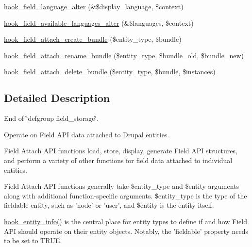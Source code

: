 \begin{DoxyCompactItemize}
\item 
\hyperlink{group__field__attach_ga6411d5b5a528850a6e53c87ff899cabc}{hook\_\-field\_\-language\_\-alter} (\&\$display\_\-language, \$context)
\item 
\hyperlink{group__field__attach_gaea2e719de3ad070e161d0d386dd18303}{hook\_\-field\_\-available\_\-languages\_\-alter} (\&\$languages, \$context)
\item 
\hyperlink{group__field__attach_gad2e99b8b55c106c289a8241db00f0f30}{hook\_\-field\_\-attach\_\-create\_\-bundle} (\$entity\_\-type, \$bundle)
\item 
\hyperlink{group__field__attach_gaf218d913150bda6004d5d8e112d3174a}{hook\_\-field\_\-attach\_\-rename\_\-bundle} (\$entity\_\-type, \$bundle\_\-old, \$bundle\_\-new)
\item 
\hyperlink{group__field__attach_gac2aac33854dd18a2037a13b133c26481}{hook\_\-field\_\-attach\_\-delete\_\-bundle} (\$entity\_\-type, \$bundle, \$instances)
\end{DoxyCompactItemize}


\subsection{Detailed Description}
End of \char`\"{}defgroup field\_\-storage\char`\"{}.

Operate on Field API data attached to Drupal entities.

Field Attach API functions load, store, display, generate Field API structures, and perform a variety of other functions for field data attached to individual entities.

Field Attach API functions generally take \$entity\_\-type and \$entity arguments along with additional function-\/specific arguments. \$entity\_\-type is the type of the fieldable entity, such as 'node' or 'user', and \$entity is the entity itself.

\hyperlink{group__hooks_gaf02318e9d0e8cdbf6d187b271b9969a8}{hook\_\-entity\_\-info()} is the central place for entity types to define if and how Field API should operate on their entity objects. Notably, the 'fieldable' property needs to be set to TRUE.

